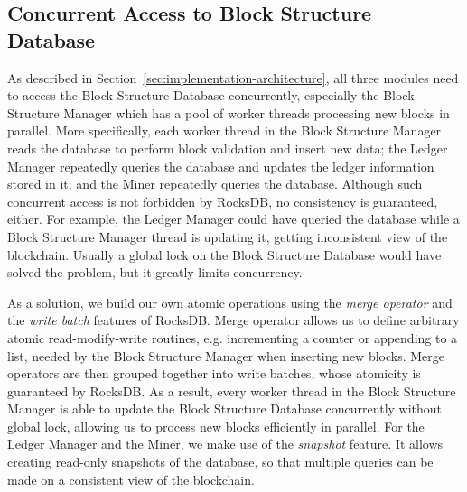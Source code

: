 \subsection{Concurrent Access to Block Structure Database}

As described in Section~\ref{sec:implementation-architecture}, all three modules need to access the Block Structure Database concurrently, especially the Block Structure Manager which has a pool of worker threads processing new blocks in parallel. More specifically, each worker thread in the Block Structure Manager reads the database to perform block validation and insert new data; the Ledger Manager repeatedly queries the database and updates the ledger information stored in it; and the Miner repeatedly queries the database. Although such concurrent access is not forbidden by RocksDB, no consistency is guaranteed, either. For example, the Ledger Manager could have queried the database while a Block Structure Manager thread is updating it, getting inconsistent view of the blockchain. Usually a global lock on the Block Structure Database would have solved the problem, but it greatly limits concurrency.

As a solution, we build our own atomic operations using the \textit{merge operator} and the \textit{write batch} features of RocksDB. Merge operator allows us to define arbitrary atomic read-modify-write routines, e.g. incrementing a counter or appending to a list, needed by the Block Structure Manager when inserting new blocks. Merge operators are then grouped together into write batches, whose atomicity is guaranteed by RocksDB. As a result, every worker thread in the Block Structure Manager is able to update the Block Structure Database concurrently without global lock, allowing us to process new blocks efficiently in parallel. For the Ledger Manager and the Miner, we make use of the \textit{snapshot} feature. It allows creating read-only snapshots of the database, so that multiple queries can be made on a consistent view of the blockchain. 



